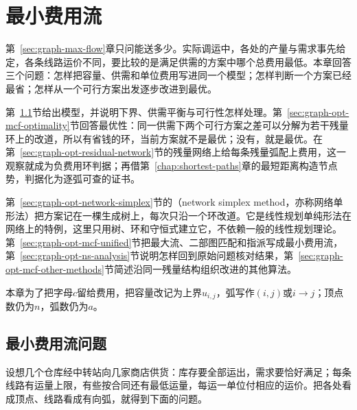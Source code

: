 
\chapter{最小费用流}
\label{sec:graph-min-cost-flow}
\label{chap:min-cost-flow}

第~\ref{sec:graph-max-flow}章只问能送多少。实际调运中，各处的产量与需求事先给定，各条线路运价不同，要比较的是满足供需的方案中哪个总费用最低。本章回答三个问题：怎样把容量、供需和单位费用写进同一个模型；怎样判断一个方案已经最省；怎样从一个可行方案出发逐步改进到最优。

第~\ref{sec:graph-opt-mcf-problem}节给出模型，并说明下界、供需平衡与可行性怎样处理。第~\ref{sec:graph-opt-mcf-optimality}节回答最优性：同一供需下两个可行方案之差可以分解为若干残量环上的改道，所以有省钱的环，当前方案就不是最优；没有，就是最优。在第~\ref{sec:graph-opt-residual-network}节的残量网络上给每条残量弧配上费用，这一观察就成为负费用环判据；再借第~\ref{chap:shortest-paths}章的最短距离构造节点势，判据化为逐弧可查的证书。

第~\ref{sec:graph-opt-network-simplex}节的（network simplex method，亦称网络单形法）把方案记在一棵生成树上，每次只沿一个环改道。它是线性规划单纯形法在网络上的特例，这里只用树、环和守恒式建立它，不依赖一般的线性规划理论。第~\ref{sec:graph-opt-mcf-unified}节把最大流、二部图匹配和指派写成最小费用流，第~\ref{sec:graph-opt-ns-analysis}节说明怎样回到原始问题核对结果，第~\ref{sec:graph-opt-mcf-other-methods}节简述沿同一残量结构组织改进的其他算法。

本章为了把字母$c$留给费用，把容量改记为上界$u_{i,j}$，弧写作$(i,j)$或$i\to j$；顶点数仍为$n$，弧数仍为$a$。

\section{最小费用流问题}
\label{sec:graph-opt-mcf-problem}

设想几个仓库经中转站向几家商店供货：库存要全部运出，需求要恰好满足；每条线路有运量上限，有些按合同还有最低运量，每运一单位付相应的运价。把各处看成顶点、线路看成有向弧，就得到下面的问题。


